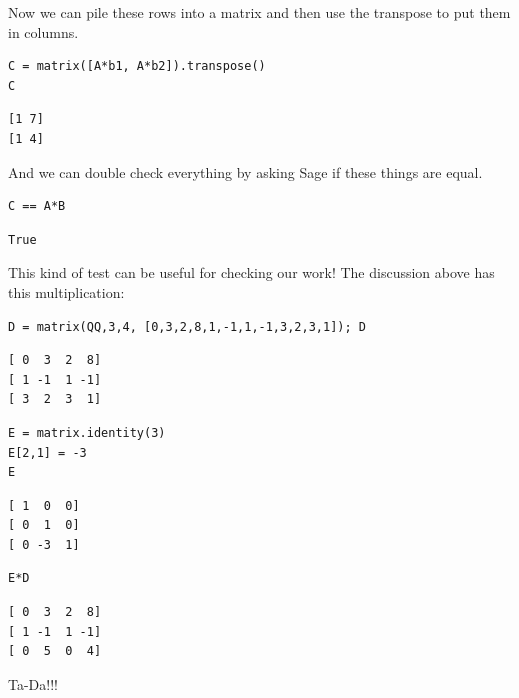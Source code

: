 \documentclass[10pt,]{book}
\theoremstyle{plain}
\theoremstyle{definition}
\numberwithin{equation}{section}
\begin{document}
      Now we can pile these rows into a matrix and then use the transpose to
      put them in columns.
\begin{lstlisting}[style=sageinput]
C = matrix([A*b1, A*b2]).transpose()
C
\end{lstlisting}
\begin{lstlisting}[style=sageoutput]
[1 7]
[1 4]
\end{lstlisting}
\par

      And we can double check everything by asking Sage if these things are equal.
\begin{lstlisting}[style=sageinput]
C == A*B
\end{lstlisting}
\begin{lstlisting}[style=sageoutput]
True
\end{lstlisting}
\par

      This kind of test can be useful for checking our work! The discussion above
      has this multiplication:
\begin{lstlisting}[style=sageinput]
D = matrix(QQ,3,4, [0,3,2,8,1,-1,1,-1,3,2,3,1]); D
\end{lstlisting}
\begin{lstlisting}[style=sageoutput]
[ 0  3  2  8]
[ 1 -1  1 -1]
[ 3  2  3  1]
\end{lstlisting}
\begin{lstlisting}[style=sageinput]
E = matrix.identity(3)
E[2,1] = -3
E
\end{lstlisting}
\begin{lstlisting}[style=sageoutput]
[ 1  0  0]
[ 0  1  0]
[ 0 -3  1]
\end{lstlisting}
\begin{lstlisting}[style=sageinput]
E*D
\end{lstlisting}
\begin{lstlisting}[style=sageoutput]
[ 0  3  2  8]
[ 1 -1  1 -1]
[ 0  5  0  4]
\end{lstlisting}
\par

      Ta-Da!!!
\typeout{************************************************}
\typeout{************************************************}
\end{document}
